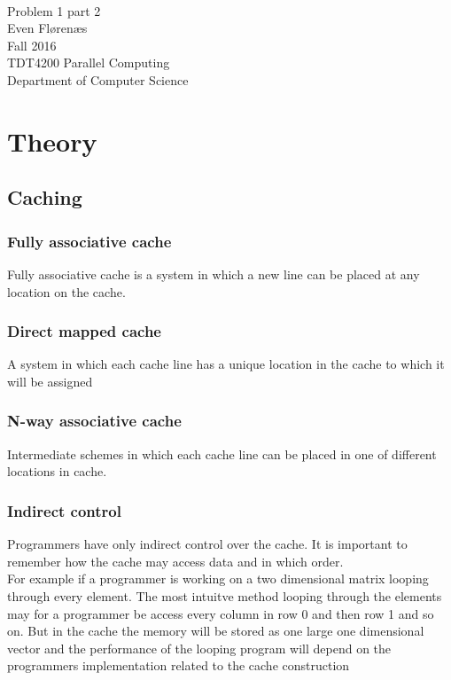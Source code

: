 \documentclass[12pt]{article}
\begin{document}
\thispagestyle{empty}
\mbox{}\\[6pc]
\begin{center}
\Huge{Problem 1 part 2}\\[2pc]

\Large{Even Flørenæs}\\[1pc]
\Large{Fall 2016}\\[2pc]

TDT4200 Parallel Computing\\
Department of Computer Science
\end{center}
\vfill

\newpage
\tableofcontents
\newpage
\section{Theory}
\subsection{Caching}
\subsubsection{Fully associative cache}
Fully associative cache is a system in which a new line can be placed at any location on the cache.
\subsubsection{Direct mapped cache}
A system in which each cache line has a unique location in the cache to which it will be assigned
\subsubsection{N-way associative cache}
Intermediate schemes in which each cache line can be placed in one of different locations in cache.

\subsubsection{Indirect control}
Programmers have only indirect control over the cache. It is important to remember how the cache may access data and in which order.
\\[10pt]
For example if a programmer is working on a two dimensional matrix looping through every element. The most intuitve method looping through the elements may for a programmer be access every column in row 0 and then row 1 and so on. But in the cache the memory will be stored as one large one dimensional vector and the performance of the looping program will depend on the programmers implementation related to the cache construction
\end{document}
